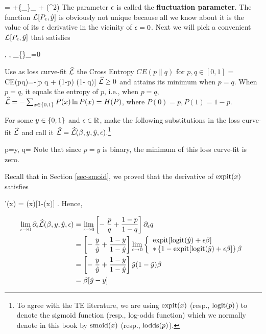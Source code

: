 \beq
{} = \call[P_0, \haty]
+\eps \{\partial_\eps {}\}_{} + \calo(\eps^2)
\eeq
The parameter $\epsilon$ is called the {\bf fluctuation parameter}.
The function ${\cal L}[P_\epsilon, {\hat{y}}]$ is obviously
not unique because all we know about it
is the value of its $\epsilon$ derivative
in the vicinity of $\epsilon=0$. Next we will pick a convenient
${\cal L}[P_\epsilon, {\hat{y}}]$ that satisfies

\beq
{},\quad
{}, \quad \partial_\eps \{\}_{}=0
\eeq


Use as loss curve-fit ${\widehat{{\cal L}}}$ the Cross Entropy
$CE(p\parallel q)$ for $p, q\in [0,1]$
\beq
\hatl = CE(p\parallel q)=-[p \ln q + (1-p) \ln(1- q)]
\eeq
${\widehat{{\cal L}}}\geq 0$ and attains its minimum when $p=q$.
When $p=q$, it equals the entropy of $p$,
i.e., when $p=q$, ${\widehat{{\cal L}}}=-\sum_{x\in \{0,1\}} P(x)\ln P(x)= H(P)$,
where $P(0)=p, P(1)=1-p$.

For some $y\in\{0,1\}$ and $\epsilon\in{ \mathbb{R}}$,
make the following
substitutions
in the loss curve-fit ${\widehat{{\cal L}}}$
and call it ${\widehat{{\cal L}}}={\widehat{{\cal L}}}(\beta, y, {\hat{y}}, \epsilon)$.\footnote{To
agree with the TE literature,
we are using ${\rm expit}(x)$
(resp., ${\rm logit}(p)$) to denote
the sigmoid function (resp., log-odds function)
which we normally
denote in this book by
 ${\rm smoid}(x)$ (resp., ${\rm lodds}(p)$).}

\beq
p=y,
\quad
q= \expit[\logit(\haty) + \eps \beta ]
\eeq
Note that since $p=y$ is binary,
the minimum of this loss curve-fit is zero.


 Recall that in Section \ref{sec-smoid}, we proved that
 the derivative of ${\rm expit}(x)$ satisfies

\beq
\expit'(x) = \expit(x)[1-\expit(x)]
\;.
\eeq
Hence,

\begin{align}
\lim_{\epsilon\rightarrow 0}\partial_\epsilon {\widehat{{\cal L}}}(\beta, y, {\hat{y}}, \epsilon)
&=
\lim_{\epsilon\rightarrow 0}
\left[-\;\frac{p}{q} + \frac{1-p}{1-q}\right]\partial_\epsilon q
\\
&=
\left[-\;\frac{y}{{\hat{y}}} + \frac{1-y}{1-{\hat{y}}}\right]
\lim_{\epsilon\rightarrow 0}
\left\{
\begin{array}{l}
{\rm expit}[{\rm logit}({\hat{y}}) + \epsilon \beta ]
\\
*\left\{1-{\rm expit}[{\rm logit}({\hat{y}}) + \epsilon \beta ]\right\}
\beta
\end{array}
\right.
\\
&=
\left[-\;\frac{y}{{\hat{y}}} + \frac{1-y}{1-{\hat{y}}}\right]
{\hat{y}}(1-{\hat{y}})\beta
\\
&=
\beta[{\hat{y}}-y]
\end{align}

